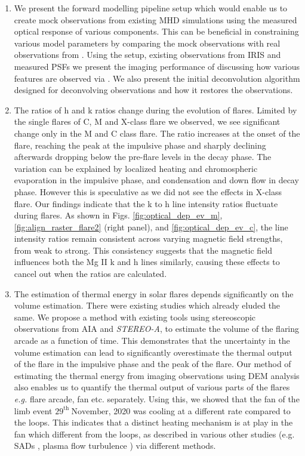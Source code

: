 \begin{enumerate}
    \item We present the forward modelling pipeline setup which would enable us to create mock {\suit} observations from existing MHD simulations using the measured optical response of various components. This can be beneficial in constraining various model parameters by comparing the mock observations with real observations from {\suit}. Using the setup, existing observations from IRIS and measured PSFs we present the imaging performance of {\suit} discussing how various features are observed via {\suit}. We also present the initial deconvolution algorithm designed for deconvolving {\suit} observations and how it restores the observations.

    \item The ratios of  h and k ratios change during the evolution of flares. Limited by the single flares of C, M and X-class flare we observed, we see significant change only in the M and C class flare. The ratio increases at the onset of the flare, reaching the peak at the impulsive phase and sharply declining afterwards dropping below the pre-flare levels in the decay phase. The variation can be explained by localized heating and chromospheric evaporation in the impulsive phase, and condensation and down flow in decay phase. However this is speculative as we did not see the effects in X-class flare. Our findings indicate that the  k to h line intensity ratios fluctuate during flares. As shown in Figs. \ref{fig:optical_dep_ev_m},\ref{fig:align_raster_flare2} (right panel), and \ref{fig:optical_dep_ev_c}, the line intensity ratios remain consistent across varying magnetic field strengths, from weak to strong. This consistency suggests that the magnetic field influences both the Mg II k and h lines similarly, causing these effects to cancel out when the ratios are calculated.
    
    \item The estimation of thermal energy in solar flares depends significantly on the volume estimation. There were existing studies \citep{hilarie05} which already eluded the same. We propose a method with existing tools using stereoscopic observations from AIA and {\it STEREO-A}, to estimate the volume of the flaring arcade as a function of time. This demonstrates that the uncertainty in the volume estimation can lead to significantly overestimate the thermal output of the flare in the impulsive phase and the peak of the flare. Our method of estimating the thermal energy from imaging observations using DEM analysis also enables us to quantify the thermal output of various parts of the flares {\it e.g.} flare arcade, fan etc. separately. Using this, we showed that the fan of the limb event $\mathrm{29^{th}~November}$, 2020 was cooling at a different rate compared to the loops. This indicates that a distinct heating mechanism is at play in the fan which different from the loops, as described in various other studies (e.g. SADs \citep{reeves17}, plasma flow turbulence \citep{xie23}) via different methods.


\end{enumerate}
